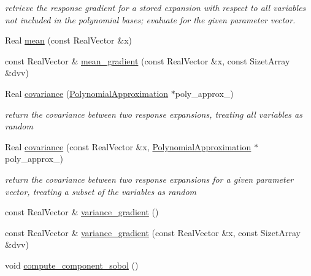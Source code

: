 \begin{DoxyCompactItemize}
\begin{DoxyCompactList}\small\item\em retrieve the response gradient for a stored expansion with respect to all variables not included in the polynomial bases; evaluate for the given parameter vector. \end{DoxyCompactList}\item 
Real \hyperlink{classPecos_1_1RegressOrthogPolyApproximation_aed107df248a4555c052446fbc10a8e61}{mean} (const Real\+Vector \&x)
\item 
const Real\+Vector \& \hyperlink{classPecos_1_1RegressOrthogPolyApproximation_a24f2edc21c9887121cda78faae1c1475}{mean\+\_\+gradient} (const Real\+Vector \&x, const Sizet\+Array \&dvv)
\item 
Real \hyperlink{classPecos_1_1RegressOrthogPolyApproximation_ac0085912d4abb9caa3f480b9c6778c0e}{covariance} (\hyperlink{classPecos_1_1PolynomialApproximation}{Polynomial\+Approximation} $\ast$poly\+\_\+approx\+\_)\label{classPecos_1_1RegressOrthogPolyApproximation_ac0085912d4abb9caa3f480b9c6778c0e}

\begin{DoxyCompactList}\small\item\em return the covariance between two response expansions, treating all variables as random \end{DoxyCompactList}\item 
Real \hyperlink{classPecos_1_1RegressOrthogPolyApproximation_afc1731a3d89818d49c03a3c20a7a2898}{covariance} (const Real\+Vector \&x, \hyperlink{classPecos_1_1PolynomialApproximation}{Polynomial\+Approximation} $\ast$poly\+\_\+approx\+\_)\label{classPecos_1_1RegressOrthogPolyApproximation_afc1731a3d89818d49c03a3c20a7a2898}

\begin{DoxyCompactList}\small\item\em return the covariance between two response expansions for a given parameter vector, treating a subset of the variables as random \end{DoxyCompactList}\item 
const Real\+Vector \& \hyperlink{classPecos_1_1RegressOrthogPolyApproximation_ae898fc2f42f1077268f89fc2e9f2c71c}{variance\+\_\+gradient} ()
\item 
const Real\+Vector \& \hyperlink{classPecos_1_1RegressOrthogPolyApproximation_a791e127a445f8a6c9c3a7966d12c1431}{variance\+\_\+gradient} (const Real\+Vector \&x, const Sizet\+Array \&dvv)
\item 
void \hyperlink{classPecos_1_1RegressOrthogPolyApproximation_abec3f45a112004b53f83b3a03e0d06db}{compute\+\_\+component\+\_\+sobol} ()\label{classPecos_1_1RegressOrthogPolyApproximation_abec3f45a112004b53f83b3a03e0d06db}


\end{DoxyCompactItemize}
